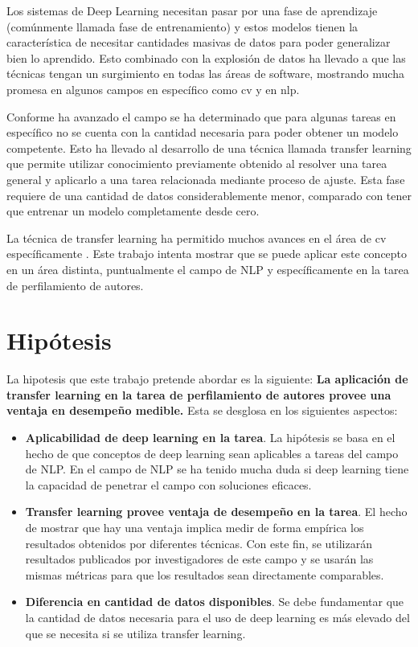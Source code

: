 Los sistemas de Deep Learning necesitan pasar por una fase de aprendizaje (comúnmente llamada fase de \gls{entrenamiento}) y estos modelos tienen la característica de necesitar cantidades masivas de datos para poder generalizar bien lo aprendido. Esto combinado con la explosión de datos ha llevado a que las técnicas tengan un surgimiento en todas las áreas de software, mostrando mucha promesa en algunos campos en específico como \gls{cv} \parencite{hoo2016deep} y en \gls{nlp}.

Conforme ha avanzado el campo se ha determinado que para algunas tareas en específico no se cuenta con la cantidad necesaria para poder obtener un modelo competente. Esto ha llevado al desarrollo de una técnica llamada transfer learning que permite utilizar conocimiento previamente obtenido al resolver una tarea general y aplicarlo a una tarea relacionada mediante proceso de ajuste. Esta fase requiere de una cantidad de datos considerablemente menor, comparado con tener que entrenar un modelo completamente desde cero.

La técnica de transfer learning ha permitido muchos avances en el área de \gls{cv} específicamente \parencite{hoo2016deep}. Este trabajo intenta mostrar que se puede aplicar este concepto en un área distinta, puntualmente el campo de NLP y específicamente en la tarea de \gls{perfilamiento de autores}.

\section{Hipótesis}

La hipotesis que este trabajo pretende abordar es la siguiente: \textbf{La aplicación de transfer learning en la tarea de perfilamiento de autores provee una ventaja en desempeño medible.} Esta se desglosa en los siguientes aspectos:

\begin{itemize}
\item \textbf{Aplicabilidad de deep learning en la tarea}. La hipótesis se basa en el hecho de que conceptos de deep learning sean aplicables a tareas del campo de NLP. En el campo de NLP se ha tenido mucha duda si deep learning tiene la capacidad de penetrar el campo con soluciones eficaces.

\item \textbf{Transfer learning provee ventaja de desempeño en la tarea}. El hecho de mostrar que hay una ventaja implica medir de forma empírica los resultados obtenidos por diferentes técnicas. Con este fin, se utilizarán resultados publicados por investigadores de este campo y se usarán las mismas métricas para que los resultados sean directamente comparables.

\item \textbf{Diferencia en cantidad de datos disponibles}. Se debe fundamentar que la cantidad de datos necesaria para el uso de deep learning es más elevado del que se necesita si se utiliza transfer learning.
\end{itemize}

